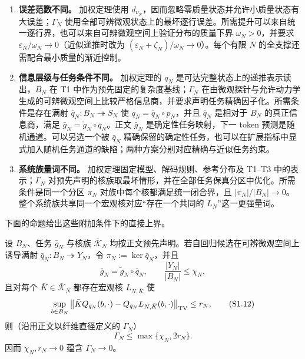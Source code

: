 \begin{enumerate}
 \item \textbf{误差范数不同。}
 加权定理使用 $d_{\nu_N}$，因而忽略零质量状态并允许小质量状态有大误差；$\Gamma_N$ 使用全部可辨微观状态上的最坏逐行误差。所需提升可以来自统一逐行界，也可以来自可辨微观空间上验证分布的质量下界 $\omega_N>0$，并要求
 $\varepsilon_N/\omega_N\to0$（近似递推时改为
 $(\varepsilon_N+\zeta_N)/\omega_N\to0$）。每个有限 $N$ 的全支撑还需配合最小质量的渐近控制。

 \item \textbf{信息层级与任务条件不同。}
 加权定理的 $q_N$ 是可达完整状态上的递推表示读出，$B_N$ 在 T1 中作为预先固定的复杂度基线；$\Gamma_N$ 在由微观探针与允许动力学生成的可辨微观空间上比较严格信息商，并要求声明任务精确因子化。所需条件是存在满射 $\bar q_N:B_N\twoheadrightarrow S_N$ 使
 $q_N=\bar q_N\circ p_N$，并且 $\bar q_N$ 是相对于 $B_N$ 的真正信息商，满足
 $\bar g_N=\widetilde g_N\circ\bar q_N$。正文 $\bar g_N$ 是确定性任务映射，下一 token 预测是随机通道。可以另选一个被 $\bar q_N$ 精确保留的确定性任务，也可以在扩展指标中显式加入随机任务通道的缺陷；两种方案分别对应精确与近似任务约束。

 \item \textbf{系统族量词不同。}
 加权定理固定模型、解码规则、参考分布及 T1--T3 中的表示；$\Gamma_N$ 对预先声明的核族取最坏情形，并在全部任务保真分区中优化。所需条件是同一个分区 $\pi_N$ 对族中每个核都满足统一闭合界，且
 $|\pi_N|/|B_N|\to0$。整个系统族共享同一个宏观核对应“存在一个共同的 $L_N$”这一更强量词。
\end{enumerate}

下面的命题给出这些附加条件下的直接上界。

\begin{proposition}
\label{prop:transformer-gamma-alignment}
设 $B_N$、任务 $\bar g_N$ 与核族
$\bar{\mathcal K}_N$ 均按正文预先声明。若自回归候选在可辨微观空间上诱导满射
$\bar q_N:B_N\twoheadrightarrow Y_N$，令
$\pi_N:=\ker\bar q_N$，并且
\[
 \bar g_N=\widetilde g_N\circ\bar q_N,
 \qquad \frac{|Y_N|}{|B_N|}\le \chi_N,
\]
且对每个 $\bar K\in\bar{\mathcal K}_N$ 都存在宏观核
$L_{N,\bar K}$ 使
\[
 \sup_{b\in B_N}
 \left\|\bar KQ_{\bar q_N}(b,\cdot)
       -Q_{\bar q_N}L_{N,\bar K}(b,\cdot)\right\|_{\TV}
 \le r_N,
 \tag{\TransformerEquationPrefix.12}\label{eq:gamma-aligned-row-bound}
\]
则（沿用正文以纤维直径定义的 $\Gamma_N$）
\[
 \Gamma_N\le\max\{\chi_N,2r_N\}.
 \tag{\TransformerEquationPrefix.13}\label{eq:gamma-candidate-upper}
\]
因而 $\chi_N,r_N\to0$ 蕴含 $\Gamma_N\to0$。
\end{proposition}

